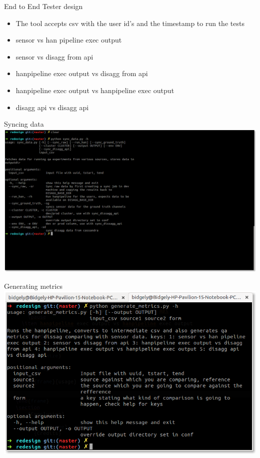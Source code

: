 \documentclass[xcolor=svgnames,handout]{beamer}
\begin{document}
    \begin{frame}{End to End Tester design}
      \begin{itemize}
      \item The tool accepts csv with the user id's and the timestamp
        to run the tests
        \pause
      \item sensor vs  han pipeline exec output
        \pause
      \item sensor vs disagg from api
        \pause
      \item hanpipeline exec output vs disagg from api
        \pause
      \item hanpipeline exec output vs hanpipeline exec output
        \pause
      \item disagg api vs disagg api
        \pause

      \end{itemize}
      
    \end{frame}

    \begin{frame}{Syncing data}
      \includegraphics[height=0.8\textheight]{sync}
    \end{frame}
    
    
    \begin{frame}{Generating metrics}
      \includegraphics[height=0.8\textheight]{usage}
    \end{frame}
\end{document}
